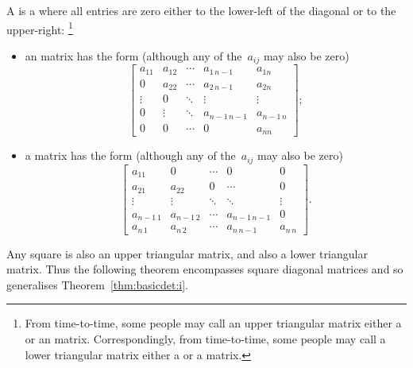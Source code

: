 \begin{definition} \label{def:trim}
A  is a  where all entries are zero either to the lower-left of the diagonal or to the upper-right:
\footnote{From time-to-time, some people may call an upper triangular matrix either a  or an  matrix.  Correspondingly, from time-to-time, some people may call a lower triangular matrix either a  or a  matrix.}
\begin{itemize}
\item an  matrix has the form (although any of the~\(a_{ij}\) may also be zero)
\begin{equation*}
\begin{bmatrix} a_{11}&a_{12}&\cdots&a_{1\,n-1}&a_{1n}
\\0&a_{22}&\cdots&a_{2\,n-1} &a_{2n}
\\\vdots&0&\ddots&\vdots&\vdots
\\0&\vdots&\ddots&a_{n-1\,n-1}&a_{n-1\,n} 
\\0&0&\cdots&0&a_{nn} \end{bmatrix};
\end{equation*}

\item a  matrix has the form (although any of the~\(a_{ij}\) may also be zero)
\begin{equation*}
\begin{bmatrix} a_{11}&0&\cdots&0&0
\\a_{21}&a_{22}&0&\cdots &0
\\\vdots&\vdots&\ddots&\ddots&\vdots
\\a_{n-1\,1}&a_{n-1\,2}&\cdots&a_{n-1\,n-1}&0 
\\a_{n\,1}&a_{n\,2}&\cdots&a_{n\,n-1}&a_{n\,n} \end{bmatrix}.
\end{equation*}
\end{itemize}
\end{definition}


Any square  is also an upper triangular matrix, and also a lower triangular matrix.
Thus the following theorem encompasses square diagonal matrices and so generalises Theorem~\ref{thm:basicdet:i}.



